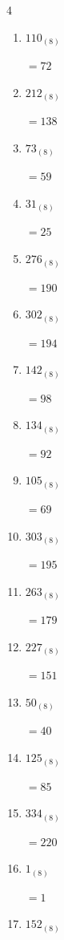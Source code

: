 \begin{multicols}{4}
\begin{enumerate}
  \item $110_{(8)}$

        $=72$

  \item $212_{(8)}$

        $=138$

  \item $73_{(8)}$

        $=59$

  \item $31_{(8)}$

        $=25$

  \item $276_{(8)}$

        $=190$

  \item $302_{(8)}$

        $=194$

  \item $142_{(8)}$

        $=98$

  \item $134_{(8)}$

        $=92$

\columnbreak %

  \item $105_{(8)}$

        $=69$

  \item $303_{(8)}$

        $=195$

  \item $263_{(8)}$

        $=179$

  \item $227_{(8)}$

        $=151$

  \item $50_{(8)}$

        $=40$

  \item $125_{(8)}$

        $=85$

  \item $334_{(8)}$

        $=220$

  \item $1_{(8)}$

        $=1$

  \item $152_{(8)}$


\end{enumerate}
\end{multicols}
